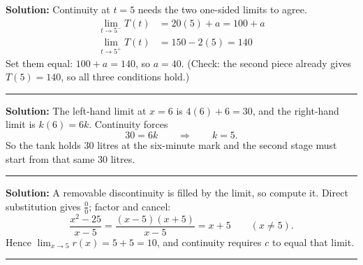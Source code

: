 \documentclass[12pt]{article}
\begin{document}



\textbf{Solution:} Continuity at $t = 5$ needs the two one-sided limits to agree.
\begin{align*}
  \lim_{t \to 5^-} T(t) &= 20(5) + a = 100 + a \\
  \lim_{t \to 5^+} T(t) &= 150 - 2(5) = 140
\end{align*}
Set them equal: $100 + a = 140$, so $a = 40$. (Check: the second piece already
gives $T(5) = 140$, so all three conditions hold.) 

\vspace{0.2cm}\noindent\rule{\linewidth}{0.2pt}\vspace{0.2cm}


\textbf{Solution:} The left-hand limit at $x = 6$ is $4(6) + 6 = 30$, and the
right-hand limit is $k(6) = 6k$. Continuity forces
\[
  30 = 6k \qquad\Longrightarrow\qquad k = 5 .
\]
So the tank holds 30 litres at the six-minute mark and the second stage must
start from that same 30 litres. 

\vspace{0.2cm}\noindent\rule{\linewidth}{0.2pt}\vspace{0.2cm}


\textbf{Solution:} A removable discontinuity is filled by the limit, so compute
it. Direct substitution gives $\frac{0}{0}$; factor and cancel:
\[
  \frac{x^2 - 25}{x - 5} = \frac{(x-5)(x+5)}{x-5} = x + 5 \qquad (x \neq 5).
\]
Hence $\lim_{x \to 5} r(x) = 5 + 5 = 10$, and continuity requires $c$ to equal
that limit. 

\vspace{0.2cm}\noindent\rule{\linewidth}{0.2pt}\vspace{0.2cm}

\end{document}
